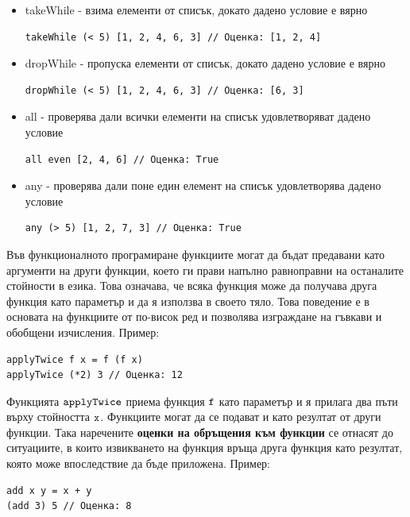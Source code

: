\documentclass{article}
\newcommand{\cppplain}[1]{\textcolor{black}{\texttt{#1}}}
\begin{document}
\begin{itemize}
\begin{lstlisting}[style=cpp]
foldr (*) 1 [1,2,3] // Оценка: 6
foldr1 (/) [1,2,3] // Оценка: 1.5
\end{lstlisting}
    \item takeWhile - взима елементи от списък, докато дадено условие е вярно
\begin{lstlisting}[style=cpp]
takeWhile (< 5) [1, 2, 4, 6, 3] // Оценка: [1, 2, 4]
\end{lstlisting}
    \item dropWhile - пропуска елементи от списък, докато дадено условие е вярно
\begin{lstlisting}[style=cpp]
dropWhile (< 5) [1, 2, 4, 6, 3] // Оценка: [6, 3]
\end{lstlisting}
    \item all - проверява дали всички елементи на списък удовлетворяват дадено условие
\begin{lstlisting}[style=cpp]
all even [2, 4, 6] // Оценка: True  
\end{lstlisting}
    \item any - проверява дали поне един елемент на списък удовлетворява дадено условие
\begin{lstlisting}[style=cpp]
any (> 5) [1, 2, 7, 3] // Оценка: True   
\end{lstlisting}
\end{itemize}
Във функционалното програмиране функциите могат да бъдат предавани като аргументи на други функции, което ги прави напълно равноправни на останалите стойности
в езика. Това означава, че всяка функция може да получава друга функция като параметър и да я използва в своето тяло. Това поведение е в основата на функциите
от по-висок ред и позволява изграждане на гъвкави и обобщени изчисления. Пример:
\begin{lstlisting}[style=cpp]
applyTwice f x = f (f x)
applyTwice (*2) 3 // Оценка: 12
\end{lstlisting}
Функцията $\cppplain{applyTwice}$ приема функция $\cppplain{f}$ като параметър и я прилага два пъти върху стойността $\cppplain{x}$. \newline\newline
Функциите могат да се подават и като резултат от други функции. Така наречените \textbf{оценки на обръщения към функции} се отнасят до ситуациите, в които
извикването на функция връща друга функция като резултат, която може впоследствие да бъде приложена. Пример:
\begin{lstlisting}[style=cpp]
add x y = x + y
(add 3) 5 // Оценка: 8
\end{lstlisting}
\end{document}
